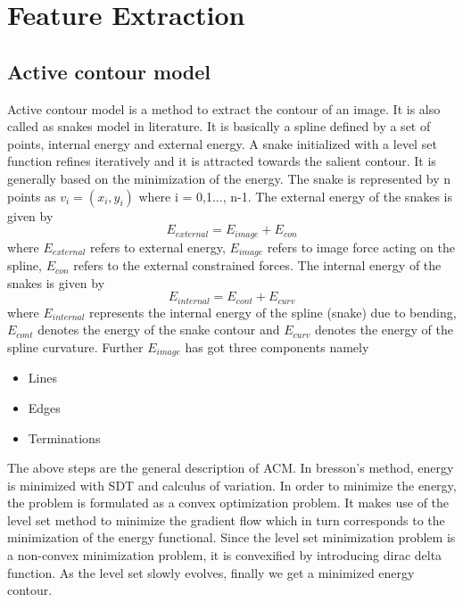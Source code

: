 \chapter{Feature Extraction}

\section{Active contour model}
Active contour model\cite{wik1} is a method to extract the contour of an image. It is also called as snakes model in literature. It is basically a spline defined by a set of points, internal energy and external energy.  A snake initialized with a level set function refines iteratively and it is attracted towards the 
salient contour. It  is generally based on the minimization of the energy. The snake is represented by n points as $v_i=(x_i,y_i)$ where i = 0,1..., n-1.
The external energy of the snakes is given by 
\begin{equation}
E_{external} = E_{image} + E_{con}
\end{equation}
where $E_{external}$ refers to external energy, $E_{image}$ refers to image force acting on the spline,
$E_{con}$ refers to the external constrained forces. 
The internal energy of the snakes is given by 
\begin{equation}
E_{internal} = E_{cont} + E_{curv}
\end{equation}
where $E_{internal}$ represents the internal energy of the spline (snake) due to bending,
$E_{cont}$ denotes the energy of the snake contour and $E_{curv}$ denotes the energy of the spline curvature. Further  $E_{image}$ has got three components namely 
       \begin{itemize}
\item     Lines
 \item     Edges
 \item     Terminations

       \end{itemize}
The above steps are the general description of ACM. In bresson's method\cite{bresson}, energy is minimized with SDT and calculus of variation. In order to minimize the
energy, the problem is formulated as a convex optimization problem. It makes use of the level set
method to minimize the gradient flow which in turn
corresponds to the minimization of the energy functional. 
Since the level set minimization problem is a
non-convex minimization problem, it is convexified
by introducing dirac delta function. As the level set slowly evolves, finally we get
a minimized energy contour. 


